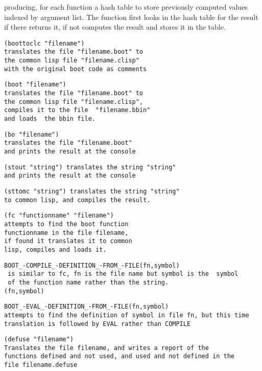 \documentclass{article}
\begin{document}
producing, for each function a
hash table to store previously computed values indexed by argument
list.  The function first looks in the hash table for the result
if there returns it, if not computes the result and stores it in the
table.

\begin{verbatim}
(boottoclc "filename")
translates the file "filename.boot" to
the common lisp file "filename.clisp"
with the original boot code as comments
\end{verbatim}

\begin{verbatim}
(boot "filename")
translates the file "filename.boot" to
the common lisp file "filename.clisp",
compiles it to the file  "filename.bbin"
and loads  the bbin file.
\end{verbatim}

\begin{verbatim}
(bo "filename")
translates the file "filename.boot"
and prints the result at the console
\end{verbatim}

\begin{verbatim}
(stout "string") translates the string "string"
and prints the result at the console
\end{verbatim}

\begin{verbatim}
(sttomc "string") translates the string "string"
to common lisp, and compiles the result.
\end{verbatim}

\begin{verbatim}
(fc "functionname" "filename")
attempts to find the boot function
functionname in the file filename,
if found it translates it to common
lisp, compiles and loads it.
\end{verbatim}

\begin{verbatim}
BOOT_-COMPILE_-DEFINITION_-FROM_-FILE(fn,symbol)
 is similar to fc, fn is the file name but symbol is the  symbol
 of the function name rather than the string.
(fn,symbol)
\end{verbatim}

\begin{verbatim}
BOOT_-EVAL_-DEFINITION_-FROM_-FILE(fn,symbol)
attempts to find the definition of symbol in file fn, but this time
translation is followed by EVAL rather than COMPILE
\end{verbatim}

\begin{verbatim}
(defuse "filename")
Translates the file filename, and writes a report of the
functions defined and not used, and used and not defined in the
file filename.defuse
\end{verbatim}
\end{document}
